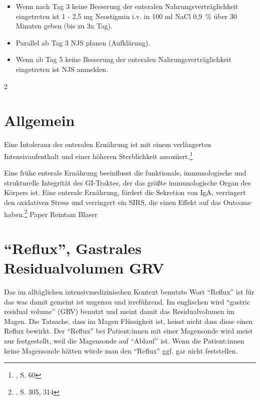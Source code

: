 \documentclass{article}
\begin{document}
\begin{enumerate}
\begin{itemize}
\begin{itemize}
\begin{itemize}
            \end{itemize}
        \end{itemize}
      \item[-] Wenn nach Tag 3 keine Besserung der enteralen Nahrungsverträglichkeit eingetreten ist 1 - 2,5 mg Neostigmin i.v. in 100 ml NaCl 0,9~\% über 30 Minuten geben (bis zu 3x Tag).
      \item[-] Parallel ab Tag 3 NJS planen (Aufklärung).
      \item[-] Wenn ab Tag 5 keine Besserung der enteralen Nahrungsverträglichkeit eingetreten ist NJS anmelden.
    \end{itemize}
\end{enumerate}

\begin{multicols}{2}
  \section{Allgemein}%
  \label{sec:Allgemein}

  Eine Intoleranz der enteralen Ernährung ist mit einem verlängerten Intensivaufenthalt und einer höheren Sterblichkeit assoziiert.\footnote{\cite{elke2015GastricResidualVolume}, S. 60}

  Eine frühe enterale Ernährung beeinflusst die funktionale, immunologische und strukturelle Integrität des GI-Traktes, der das größte immunologische Organ des Körpers ist. Eine enterale Ernährung, fördert die Sekretion von IgA, verringert den oxidativen Stress und verringert ein SIRS, die einen Effekt auf das Outcome haben.\footnote{\cite{mcclave2009PhysiologicResponseAssociated}, S. 305, 314}
  Paper Reintam Blaser


  \section{\enquote{Reflux}, Gastrales Residualvolumen GRV}%
  \label{sec:Reflux Gastrales Residualvolumen GRV}
  Das im alltäglichen intensivmedizinischen Kontext benutzte Wort \enquote{Reflux} ist für das was damit gemeint ist ungenau und irreführend. Im englischen wird  \enquote{gastric residual volume} (GRV) benutzt und meint damit das Residualvolumen im Magen. Die Tatsache, dass im Magen Flüssigkeit ist, heisst nicht dass diese einen Reflux bewirkt. Der \enquote{Reflux} bei Patient:innen mit einer Magensonde wird meist nur festgestellt, weil die Magensonde auf \enquote{Ablauf} ist. Wenn die Patient:innen keine Magensonde hätten würde man den \enquote{Reflux} ggf. gar nicht feststellen.


\end{multicols}
\end{document}
